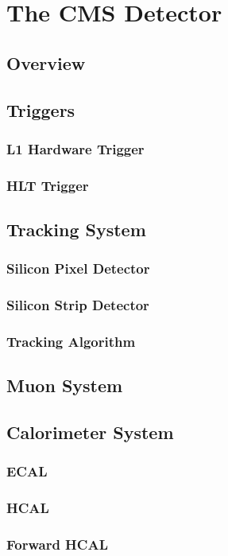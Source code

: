 \chapter{The CMS Detector}

\section{Overview}

\section{Triggers}

\subsection{L1 Hardware Trigger}

\subsection{HLT Trigger}

\section{Tracking System}

\subsection{Silicon Pixel Detector}

\subsection{Silicon Strip Detector}

\subsection{Tracking Algorithm}

\section{Muon System}

\section{Calorimeter System}

\subsection{ECAL}

\subsection{HCAL}

\subsection{Forward HCAL}
